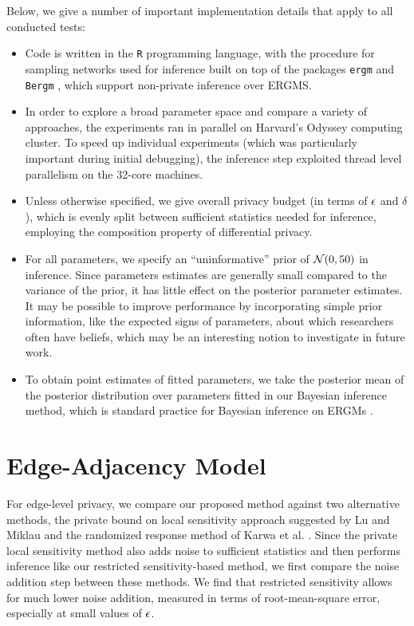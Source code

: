 Below, we give a number of important implementation details that apply to all conducted tests:
\begin{itemize}
	\item Code is written in the \texttt{R} programming language, with the procedure for sampling networks used for inference built on top of the packages \texttt{ergm} \cite{ergm} and \texttt{Bergm} \cite{Bergm}, which support non-private inference over ERGMS.
	\item In order to explore a broad parameter space and compare a variety of approaches, the experiments ran in parallel on Harvard's Odyssey computing cluster. To speed up individual experiments (which was particularly important during initial debugging), the  inference step exploited thread level parallelism  on the 32-core machines.
	\item Unless otherwise specified, we give overall privacy budget (in terms of $\epsilon$ and $\delta$), which is evenly split between sufficient statistics needed for inference, employing the composition property of differential privacy.
	\item For all parameters, we specify an ``uninformative'' prior of $\mathcal{N}(0, 50)$ in inference. Since parameters estimates are generally small compared to the variance of the prior, it has little effect on the posterior parameter estimates.  It may be possible to improve performance by incorporating simple prior information, like the expected signs of parameters, about which researchers often have beliefs, which may be an interesting notion to investigate in future work.
	\item To obtain point estimates of fitted parameters, we take the posterior mean of the posterior distribution over parameters fitted in our Bayesian inference method, which is standard practice for Bayesian inference on ERGMs \cite{CF11}.
\end{itemize}
 
 \section{Edge-Adjacency Model}
 
For edge-level privacy, we compare our proposed method against two alternative methods, the private bound on local sensitivity approach suggested by Lu and Miklau \cite{LM14} and the randomized response method of Karwa et al. \cite{KKS17}. Since the private local sensitivity method also adds noise to sufficient statistics and then performs inference like our restricted sensitivity-based method, we first compare the noise addition step between these methods. We find that restricted sensitivity allows for much lower noise addition, measured in terms of root-mean-square error, especially at small values of $\epsilon$. 

